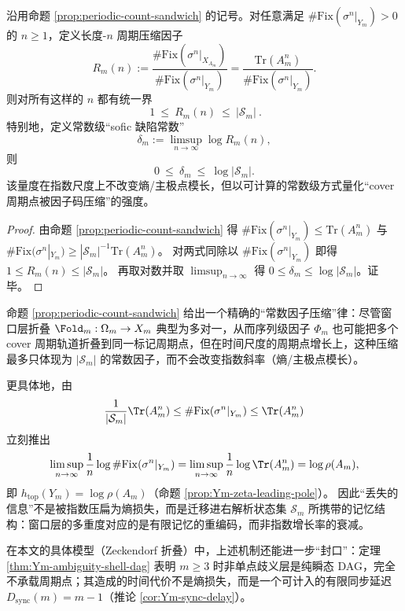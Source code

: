 \begin{corollary}\label{cor:Ym-periodic-compression-ratio}
沿用命题 \ref{prop:periodic-count-sandwich} 的记号。对任意满足 \(\#\mathrm{Fix}(\sigma^n|_{Y_m})>0\) 的 \(n\ge 1\)，定义长度-\(n\) 周期压缩因子
\[
R_m(n):=\frac{\#\mathrm{Fix}(\sigma^n|_{X_{A_m}})}{\#\mathrm{Fix}(\sigma^n|_{Y_m})}
=\frac{\mathrm{Tr}(A_m^n)}{\#\mathrm{Fix}(\sigma^n|_{Y_m})}.
\]
则对所有这样的 \(n\) 都有统一界
\[
\boxed{\ 1\ \le\ R_m(n)\ \le\ |\mathcal{S}_m|\ }.
\]
特别地，定义常数级“sofic 缺陷常数”
\[
\delta_m:=\limsup_{n\to\infty}\log R_m(n),
\]
则
\[
0\ \le\ \delta_m\ \le\ \log|\mathcal{S}_m|.
\]
该量度在指数尺度上不改变熵/主极点模长，但以可计算的常数级方式量化“cover 周期点被因子码压缩”的强度。
\end{corollary}

\begin{proof}
由命题 \ref{prop:periodic-count-sandwich} 得
\(
\#\mathrm{Fix}(\sigma^n|_{Y_m})\le \mathrm{Tr}(A_m^n)
\)
与
\(
\#\mathrm{Fix}(\sigma^n|_{Y_m})\ge |\mathcal{S}_m|^{-1}\mathrm{Tr}(A_m^n)
\)。
对两式同除以 \(\#\mathrm{Fix}(\sigma^n|_{Y_m})\) 即得 \(1\le R_m(n)\le |\mathcal{S}_m|\)。
再取对数并取 \(\limsup_{n\to\infty}\) 得 \(0\le \delta_m\le \log|\mathcal{S}_m|\)。证毕。
\end{proof}

\begin{remark}[机制：窗口层多对一不等于时间层熵损失]\label{rem:Ym-no-entropy-loss-mechanism}
命题 \ref{prop:periodic-count-sandwich} 给出一个精确的“常数因子压缩”律：尽管窗口层折叠 \(\Fold_m:\Omega_m\to X_m\) 典型为多对一，从而序列级因子 \(\Phi_m\) 也可能把多个 cover 周期轨道折叠到同一标记周期点，但在时间尺度的周期点增长上，这种压缩最多只体现为 \(|\mathcal{S}_m|\) 的常数因子，而不会改变指数斜率（熵/主极点模长）。

更具体地，由
\[
\frac{1}{|\mathcal{S}_m|}\Tr(A_m^n)\le \#\mathrm{Fix}(\sigma^n|_{Y_m})\le \Tr(A_m^n)
\]
立刻推出
\[
\limsup_{n\to\infty}\frac{1}{n}\log\#\mathrm{Fix}(\sigma^n|_{Y_m})
=\limsup_{n\to\infty}\frac{1}{n}\log\Tr(A_m^n)
=\log\rho(A_m),
\]
即 \(h_{\mathrm{top}}(Y_m)=\log\rho(A_m)\)（命题 \ref{prop:Ym-zeta-leading-pole}）。
因此“丢失的信息”不是被指数压扁为熵损失，而是迁移进右解析状态集 \(\mathcal{S}_m\) 所携带的记忆结构：窗口层的多重度对应的是有限记忆的重编码，而非指数增长率的衰减。

在本文的具体模型（Zeckendorf 折叠）中，上述机制还能进一步“封口”：定理 \ref{thm:Ym-ambiguity-shell-dag} 表明 $m\ge 3$ 时非单点歧义层是纯瞬态 DAG，完全不承载周期点；其造成的时间代价不是熵损失，而是一个可计入的有限同步延迟 \(D_{\mathrm{sync}}(m)=m-1\)（推论 \ref{cor:Ym-sync-delay}）。
\end{remark}

